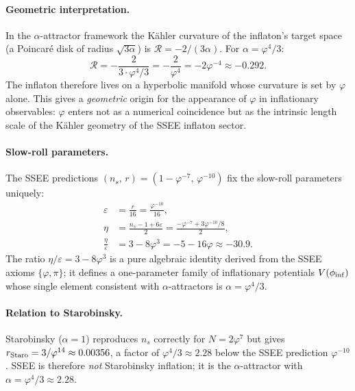 \paragraph{Geometric interpretation.}
In the $\alpha$-attractor framework the K\"{a}hler curvature of the
inflaton's target space (a Poincar\'{e} disk of radius $\sqrt{3\alpha}$)
is $\mathcal{R} = -2/(3\alpha)$.
For $\alpha = \varphi^{4}/3$:
\begin{equation}
  \mathcal{R} = -\frac{2}{3 \cdot \varphi^{4}/3} = -\frac{2}{\varphi^{4}}
               = -2\varphi^{-4} \approx -0.292.
  \label{eq:kahler_curvature}
\end{equation}
The inflaton therefore lives on a hyperbolic manifold whose curvature is
set by $\varphi$ alone. This gives a \emph{geometric} origin for the
appearance of $\varphi$ in inflationary observables: $\varphi$ enters not
as a numerical coincidence but as the intrinsic length scale of the
K\"{a}hler geometry of the SSEE inflaton sector.

\paragraph{Slow-roll parameters.}
The SSEE predictions $(n_s,\,r) = (1-\varphi^{-7},\,\varphi^{-10})$ fix the
slow-roll parameters uniquely:
\begin{align}
  \varepsilon &= \frac{r}{16} = \frac{\varphi^{-10}}{16}, \label{eq:sr_eps} \\
  \eta &= \frac{n_s - 1 + 6\varepsilon}{2}
        = \frac{-\varphi^{-7} + 3\varphi^{-10}/8}{2}, \label{eq:sr_eta} \\
  \frac{\eta}{\varepsilon} &= 3 - 8\varphi^{3} = -5 - 16\varphi \approx -30.9.
  \label{eq:sr_ratio}
\end{align}
The ratio $\eta/\varepsilon = 3 - 8\varphi^{3}$ is a pure algebraic
identity derived from the SSEE axioms $\{\varphi, \pi\}$; it defines a
one-parameter family of inflationary potentials $V(\phi_{\rm inf})$ whose
single element consistent with $\alpha$-attractors is $\alpha = \varphi^{4}/3$.

\paragraph{Relation to Starobinsky.}
Starobinsky ($\alpha = 1$) reproduces $n_s$ correctly for $N = 2\varphi^{7}$
but gives $r_{\rm Staro} = 3/\varphi^{14} \approx 0.00356$, a factor of
$\varphi^{4}/3\approx 2.28$ below the SSEE prediction $\varphi^{-10}$.
SSEE is therefore \emph{not} Starobinsky inflation; it is the
$\alpha$-attractor with $\alpha=\varphi^4/3\approx2.28$.

